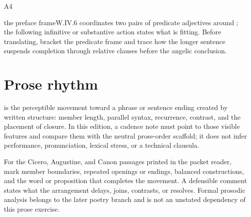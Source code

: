 \begin{courseunit}{A4}
\begin{workedexample}{the preface frame}{W.IV.6}
 coordinates two pairs of
predicate adjectives around ; the following infinitive or
substantive action states what is fitting. Before translating, bracket the
predicate frame and trace how the longer sentence suspends completion through
relative clauses before the angelic conclusion.
\end{workedexample}

\section{Prose rhythm}

 is the perceptible movement toward a phrase or
sentence ending created by written structure: member length, parallel syntax,
recurrence, contrast, and the placement of closure.  In this edition, a
cadence note must point to those visible features and compare them with the
neutral prose-order scaffold; it does not infer performance, pronunciation,
lexical stress, or a technical clausula.

For the Cicero, Augustine, and Canon passages printed in the packet reader,
mark member boundaries, repeated openings or endings, balanced constructions,
and the word or proposition that completes the movement.  A defensible comment
states what the arrangement delays, joins, contrasts, or resolves.  Formal
prosodic analysis belongs to the later poetry branch and is not an unstated
dependency of this prose exercise.



\end{courseunit}

